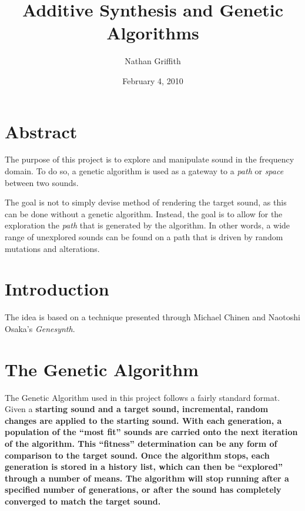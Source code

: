\documentclass[11pt]{article}
\title{Additive Synthesis and Genetic Algorithms}
\author{Nathan  Griffith}
\date{February 4, 2010}
\begin{document}
\maketitle %

\section{Abstract}
The purpose of this project is to explore and manipulate sound in the frequency domain. To do so, a genetic algorithm is used as a gateway to a \emph{path} or \emph{space} between two sounds. 

The goal is not to simply devise method of rendering the target sound, as this can be done without a genetic algorithm. Instead, the goal is to allow for the exploration the \emph{path} that is generated by the algorithm. In other words, a wide range of unexplored sounds can be found on a path that is driven by random mutations and alterations. 

\section{Introduction}

The idea is based on a technique presented through Michael Chinen and Naotoshi Osaka's \emph{Genesynth}\cite{genesynth}.

\section{The Genetic Algorithm}
The Genetic Algorithm used in this project follows a fairly standard format. Given a \bf{starting sound} and a \bf{target sound}, incremental, random changes are applied to the starting sound. With each generation, a population of the ``most fit'' sounds are carried onto the next iteration of the algorithm. This ``fitness'' determination can be any form of comparison to the \bf{target sound}. Once the algorithm stops, each generation is stored in a history list, which can then be ``explored'' through a number of means. The algorithm will stop running after a specified number of generations, or after the sound has completely converged to match the target sound. 
\end{document}
